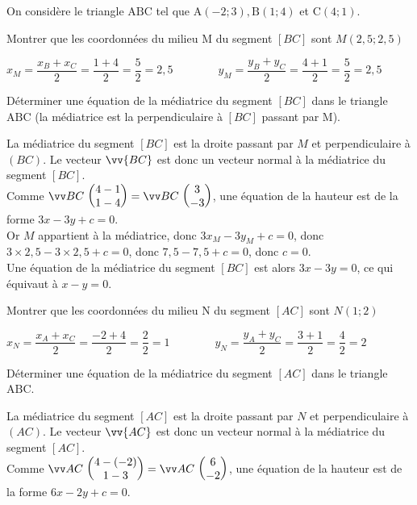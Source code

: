 \documentclass[12pt,a4paper]{article}  %
\begin{document}
On considère le triangle $\mathrm{ABC}$ tel que $\mathrm{A}(-2 ;3), \mathrm{B}(1 ; 4)$ et $\mathrm{C}(4 ; 1)$.
\begin{enumMet}
    \item Montrer que les coordonnées du milieu M du segment $[BC]$ sont $M(2,5;2,5)$\\
    \begin{corrBox}
    	$x_M=\dfrac{x_B+x_C}{2}=\dfrac{1+4}{2}=\dfrac{5}{2}=2,5\quad \quad \quad \quad y_M=\dfrac{y_B+y_C}{2}=\dfrac{4+1}{2}=\dfrac{5}{2}=2,5$
    \end{corrBox}
    \item Déterminer une équation de la médiatrice  du segment $[BC]$ dans le triangle $\mathrm{ABC}$ (la médiatrice est la perpendiculaire à $[BC]$ passant par M).\\
    \begin{corrBox}
    	La médiatrice du segment $[BC]$ est la droite passant par $M$ et perpendiculaire à $(BC)$. Le vecteur $\vv{BC}$ est donc un vecteur normal à la médiatrice du segment $[BC]$.\\
    	Comme $\Coord{BC}{4-1}{1-4}=\Coord{BC}{3}{-3}$, une équation de la hauteur est de la forme $3x-3y+c=0$.\\
    	Or $M$ appartient à la médiatrice, donc $3x_{M}-3y_{M}+c=0$, donc $3\times 2,5-3\times2,5+c=0$, donc $7,5-7,5+c=0$, donc $c=0$.\\
    	Une équation de la médiatrice du segment $[BC]$ est alors $3x-3y=0$, ce qui équivaut à $x-y=0$.
    \end{corrBox}
    \item {} Montrer que les coordonnées du milieu N du segment $[AC]$ sont $N(1;2)$\\
    \begin{corrBox}
    	$x_N=\dfrac{x_A+x_C}{2}=\dfrac{-2+4}{2}=\dfrac{2}{2}=1\quad \quad \quad \quad y_N=\dfrac{y_A+y_C}{2}=\dfrac{3+1}{2}=\dfrac{4}{2}=2$
    \end{corrBox}
    \item Déterminer une équation de la médiatrice  du segment $[AC]$ dans le triangle $\mathrm{ABC}$.\\
    \begin{corrBox}
    	La médiatrice du segment $[AC]$ est la droite passant par $N$ et perpendiculaire à $(A C)$. Le vecteur $\vv{A C}$ est donc un vecteur normal à la médiatrice du segment $[AC]$.\\
    	Comme $\Coord{AC}{4-(-2)}{1-3}=\Coord{AC}{6}{-2}$, une équation de la hauteur est de la forme $6x-2y+c=0$.\\

\end{corrBox}
\end{enumMet}
\end{document}
